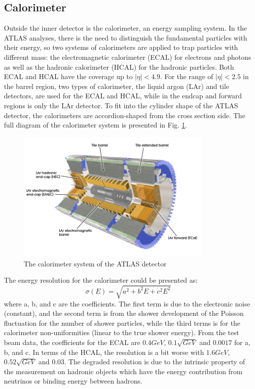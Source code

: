 \subsection{Calorimeter}
Outside the inner detector is the calorimeter, an energy sampling system. In the ATLAS analyses, there is the need to distinguish the fundamental particles with their energy, so two systems of calorimeters are applied to trap particles with different mass: the electromagnetic calorimeter (ECAL) for electrons and photons as well as the hadronic calorimeter (HCAL) for the hadronic particles. Both ECAL and HCAL have the coverage up to $|\eta|<4.9$. For the range of $|\eta|<2.5$ in the barrel region, two types of calorimeter, the liquid argon (LAr) and tile detectors, are used for the ECAL and HCAL, while in the endcap and forward regions is only the LAr detector. To fit into the cylinder shape of the ATLAS detector, the calorimeters are accordion-shaped from the cross section side. The full diagram of the calorimeter system is presented in Fig. \ref{Fig:calorimeter}. 
\begin{figure}[!h]                %
	\includegraphics[width=0.85\textwidth]{Chapter2/calorimeter}
	\centering
	\begin{center}
		\caption{The calorimeter system of the ATLAS detector}
		\label{Fig:calorimeter}            
	\end{center}
\end{figure}
The energy resolution for the calorimeter could be presented as:
\begin{equation}
\sigma (E)=\sqrt{a^{2}+b^{2}E+c^{2}E^{2}}
\end{equation}
where a, b, and c are the coefficients. The first term is due to the electronic noise (constant), and the second term is from the shower development of the Poisson fluctuation for the number of shower particles, while the third terms is for the calorimeter non-uniformities (linear to the true shower energy). From the test beam data, the coefficients for the ECAL are $0.4GeV$, $0.1\sqrt{GeV}$ and $0.0017$ for a, b, and c. In terms of the HCAL, the resolution is a bit worse with $1.6GeV$, $0.52\sqrt{GeV}$ and $0.03$. The degraded resolution is due to the intrinsic property of the measurement on hadronic objects which have the energy contribution from neutrinos or binding energy between hadrons. 
